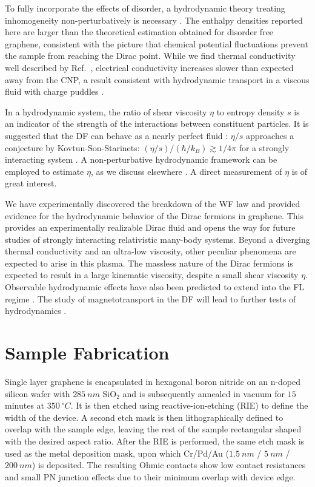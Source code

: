 To fully incorporate the effects of disorder, a hydrodynamic theory treating inhomogeneity non-perturbatively is necessary \cite{lucas_hydrodynamic_2015, lucas_transport_2016}. The enthalpy densities reported here are larger than the theoretical estimation obtained for disorder free graphene, consistent with the picture that chemical potential fluctuations prevent the sample from reaching the Dirac point. 
While we find thermal conductivity well described by Ref.~\cite{muller_quantum-critical_2008, foster_slow_2009}, electrical conductivity increases slower than expected away from the CNP, a result consistent with hydrodynamic transport in a viscous fluid with charge puddles \cite{lucas_transport_2016}. 

In a hydrodynamic system, the ratio of shear viscosity $\eta$ to entropy density $s$ is an indicator of the strength of the interactions between constituent particles.   It is suggested that the DF can behave as a nearly perfect fluid \cite{muller_graphene:_2009}: $\eta/s$ approaches a conjecture by Kovtun-Son-Starinets: $(\eta/s)/(\hbar/k_B) \gtrsim 1/4\pi$ for a strongly interacting system \cite{kovtun_viscosity_2005}.  A non-perturbative hydrodynamic framework can be employed to estimate $\eta$, as we discuss elsewhere \cite{lucas_transport_2016}.   A direct measurement of $\eta$ is of great interest. 


We have experimentally discovered the breakdown of the WF law and provided evidence for the hydrodynamic behavior of the Dirac fermions in graphene. This provides an experimentally realizable Dirac fluid and opens the way for future studies of strongly interacting relativistic many-body systems. Beyond a diverging thermal conductivity and an ultra-low viscosity, other peculiar phenomena are expected to arise in this plasma. The massless nature of the Dirac fermions is expected to result in a large kinematic viscosity, despite a small shear viscosity $\eta$.  Observable hydrodynamic effects have also been predicted to extend into the FL regime \cite{principi_bulk_2015}.  The study of magnetotransport in the DF will lead to further tests of hydrodynamics \cite{muller_quantum-critical_2008, hartnoll_theory_2007}.


\section{Sample Fabrication}
Single layer graphene is encapsulated in hexagonal boron nitride on an n-doped silicon wafer with $285~nm$ SiO$_2$ \cite{wang_one-dimensional_2013} and is subsequently annealed in vacuum for $15$ minutes at $350~^\circ C$. It is then etched using reactive-ion-etching (RIE) to define the width of the device. A second etch mask is then lithographically defined to overlap with the sample edge, leaving the rest of the sample rectangular shaped with the desired aspect ratio. After the RIE is performed, the same etch mask is used as the metal deposition mask, upon which Cr/Pd/Au ($1.5~nm$ / $5~nm$ / $200~nm$) is deposited. The resulting Ohmic contacts show low contact resistances and small PN junction effects due to their minimum overlap with device edge. 

